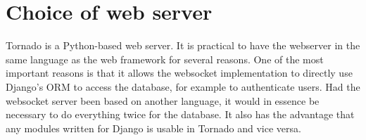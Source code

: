 \section{Choice of web server}
Tornado\cite{tornadoweb11} is a Python-based web server. It is practical to have the webserver in the same language as the web framework for several reasons. One of the most important reasons is that it allows the websocket implementation to directly use Django's ORM to access the database, for example to authenticate users. Had the websocket server been based on another language, it would in essence be necessary to do everything twice for the database. It also has the advantage that any modules written for Django is usable in Tornado and vice versa.
